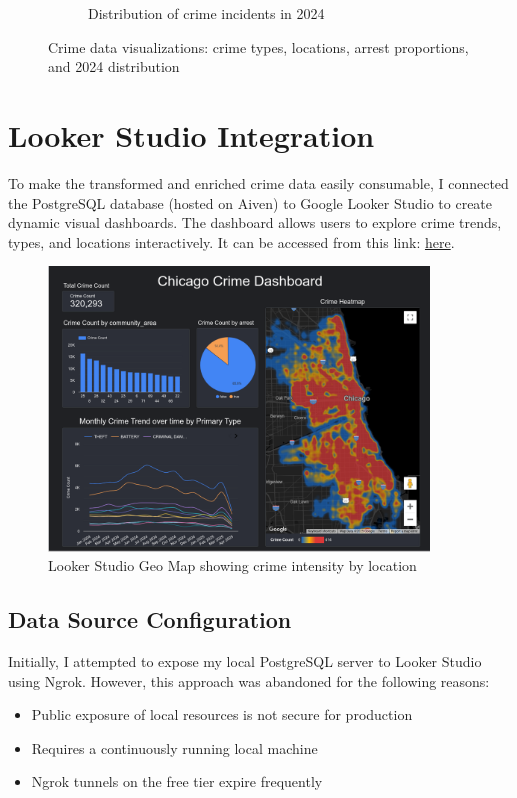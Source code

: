 \documentclass[12pt]{article}
\begin{document}
\begin{figure}[H]
\begin{subfigure}[t]{0.49\textwidth}
        \caption{Distribution of crime incidents in 2024}
        \label{fig:crime_distribution_in_2024}
    \end{subfigure}
    \caption{Crime data visualizations: crime types, locations, arrest proportions, and 2024 distribution}
    \label{fig:crime_data_visualizations}
\end{figure}



\section{Looker Studio Integration}

To make the transformed and enriched crime data easily consumable, I connected the PostgreSQL database (hosted on Aiven) to Google Looker Studio to create dynamic visual dashboards. The dashboard allows users to explore crime trends, types, and locations interactively. It can be accessed from this link: \href{https://lookerstudio.google.com/reporting/73440c10-3d68-47ac-b150-026b80c468c0}{here}.

\begin{figure}[h!]
    \centering
    \includegraphics[width=0.9\textwidth]{figures/looker_dashboard.png}
    \caption{Looker Studio Geo Map showing crime intensity by location}
    \label{fig:looker_dashboard}
\end{figure}

\subsection*{Data Source Configuration}
Initially, I attempted to expose my local PostgreSQL server to Looker Studio using Ngrok. However, this approach was abandoned for the following reasons:
\begin{itemize}
    \item Public exposure of local resources is not secure for production
    \item Requires a continuously running local machine
    \item Ngrok tunnels on the free tier expire frequently
\end{itemize}
\end{document}
